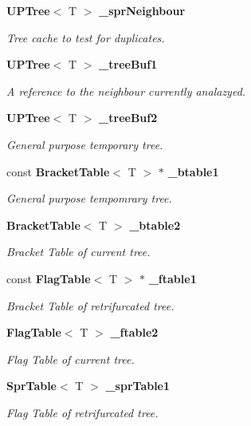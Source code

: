 \begin{CompactItemize}
{\bf UPTree}$<$ T $>$ {\bf \_\-spr\-Neighbour}
\begin{CompactList}\small\item\em Tree cache to test for duplicates. \item\end{CompactList}\item 
{\bf UPTree}$<$ T $>$ {\bf \_\-tree\-Buf1}
\begin{CompactList}\small\item\em A reference to the neighbour currently analazyed. \item\end{CompactList}\item 
{\bf UPTree}$<$ T $>$ {\bf \_\-tree\-Buf2}
\begin{CompactList}\small\item\em General purpose temporary tree. \item\end{CompactList}\item 
const {\bf Bracket\-Table}$<$ T $>$ $\ast$ {\bf \_\-btable1}
\begin{CompactList}\small\item\em General purpose tempomrary tree. \item\end{CompactList}\item 
{\bf Bracket\-Table}$<$ T $>$ {\bf \_\-btable2}
\begin{CompactList}\small\item\em Bracket Table of current tree. \item\end{CompactList}\item 
const {\bf Flag\-Table}$<$ T $>$ $\ast$ {\bf \_\-ftable1}
\begin{CompactList}\small\item\em Bracket Table of retrifurcated tree. \item\end{CompactList}\item 
{\bf Flag\-Table}$<$ T $>$ {\bf \_\-ftable2}
\begin{CompactList}\small\item\em Flag Table of current tree. \item\end{CompactList}\item 
{\bf Spr\-Table}$<$ T $>$ {\bf \_\-spr\-Table1}
\begin{CompactList}\small\item\em Flag Table of retrifurcated tree. \item\end{CompactList}\item 

\end{CompactItemize}
